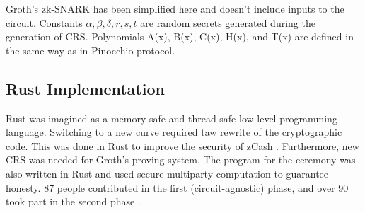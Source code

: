 Groth's zk-SNARK has been simplified here and doesn't include inputs to the circuit. Constants $\alpha, \beta, \delta, r, s, t$ are random secrets generated during the generation of CRS. Polynomials A(x), B(x), C(x), H(x), and T(x) are defined in the same way as in Pinocchio \cite{parno2013pinocchio} protocol.

\subsection{Rust Implementation}

Rust \cite{rustlang} was imagined as a memory-safe and thread-safe low-level programming language. Switching to a new curve required taw rewrite of the cryptographic code. This was done in Rust to improve the security of zCash \cite{zcashbellman}. Furthermore, new CRS was needed for Groth's proving system. The program for the ceremony was also written in Rust and used secure multiparty computation to guarantee honesty. 87 people contributed in the first (circuit-agnostic) phase, and over 90 took part in the second phase \cite{zcashparamgen}.
